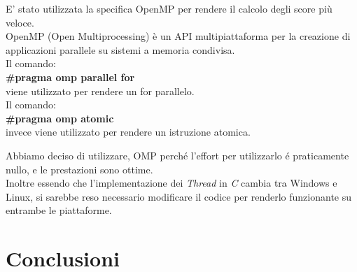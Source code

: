 \documentclass{beamer}
\begin{document}
\begin{frame}[fragile]
E' stato utilizzata la specifica OpenMP per rendere il calcolo degli score più veloce.\\
\medskip
OpenMP (Open Multiprocessing) è un API multipiattaforma per la creazione di applicazioni parallele su sistemi a memoria condivisa.\\
\smallskip
Il comando:\\
\textbf{\#pragma omp parallel for}\\
viene utilizzato per rendere un for parallelo.\\
\smallskip
Il comando:\\
\textbf{\#pragma omp atomic}\\
invece viene utilizzato per rendere un istruzione atomica.\\
\end{frame}

\begin{frame}
Abbiamo deciso di utilizzare, OMP perch\'e l'effort per utilizzarlo \'e praticamente nullo, e le prestazioni sono ottime.\\
\medskip
Inoltre essendo che l'implementazione dei \textit{Thread} in \textit{C} cambia tra Windows e Linux, si sarebbe reso necessario modificare il codice per renderlo funzionante su entrambe le piattaforme.
\end{frame}

\section{Conclusioni}
\begin{frame}
\end{frame}
\end{document}
